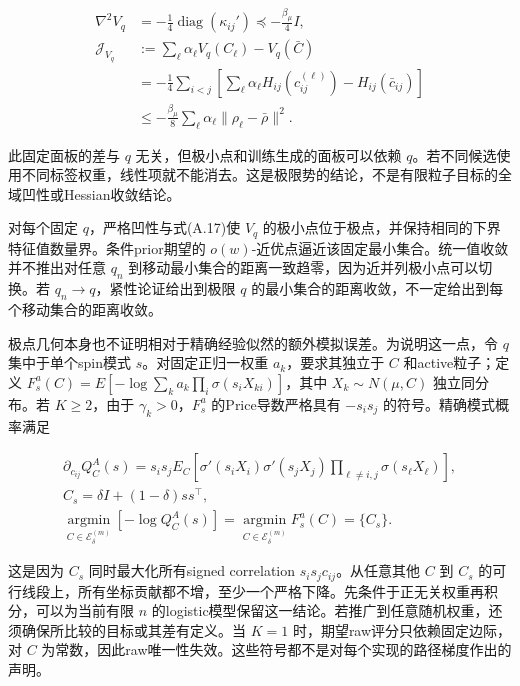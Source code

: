 \documentclass[11pt,a4paper]{article}
\begin{document}
\[
\begin{aligned}
\nabla^2V_q&=-\tfrac14\operatorname{diag}(\kappa_{ij}')
\preceq-\tfrac{\beta_\mu}{4}I,\\
\mathcal J_{V_q}
&:=\sum_\ell\alpha_\ell V_q(C_\ell)-V_q(\bar C)\\
&=-\tfrac14\sum_{i<j}\left[
\sum_\ell\alpha_\ell H_{ij}(c_{ij}^{(\ell)})-H_{ij}(\bar c_{ij})\right]\\
&\le-\tfrac{\beta_\mu}{8}\sum_\ell\alpha_\ell
\|\rho_\ell-\bar\rho\|^2.
\end{aligned}
\tag{A.34}
\]

此固定面板的差与 \(q\) 无关，但极小点和训练生成的面板可以依赖
\(q\)。若不同候选使用不同标签权重，线性项就不能消去。这是极限势的结论，不是有限粒子目标的全域凹性或Hessian收敛结论。

对每个固定 \(q\)，严格凹性与式(A.17)使 \(V_q\)
的极小点位于极点，并保持相同的下界特征值数量界。条件prior期望的
\(o(w)\)-近优点逼近该固定最小集合。统一值收敛并不推出对任意 \(q_n\)
到移动最小集合的距离一致趋零，因为近并列极小点可以切换。若
\(q_n\to q\)，紧性论证给出到极限 \(q\)
的最小集合的距离收敛，不一定给出到每个移动集合的距离收敛。

极点几何本身也不证明相对于精确经验似然的额外模拟误差。为说明这一点，令
\(q\) 集中于单个spin模式 \(s\)。对固定正归一权重 \(a_k\)，要求其独立于
\(C\) 和active粒子；定义
\(F_s^a(C)=E[-\log\sum_k a_k\prod_i\sigma(s_iX_{ki})]\)，其中
\(X_k\sim N(\mu,C)\) 独立同分布。若 \(K\ge2\)，由于
\(\gamma_k>0\)，\(F_s^a\) 的Price导数严格具有 \(-s_is_j\)
的符号。精确模式概率满足

\[
\begin{gathered}
\partial_{c_{ij}}Q_C^A(s)=s_is_jE_C\left[
\sigma'(s_iX_i)\sigma'(s_jX_j)
\prod_{\ell\ne i,j}\sigma(s_\ell X_\ell)\right],\\
C_s=\delta I+(1-\delta)ss^\top,\\
\operatorname*{argmin}_{C\in\mathcal E_\delta^{(m)}}[-\log Q_C^A(s)]
=\operatorname*{argmin}_{C\in\mathcal E_\delta^{(m)}}F_s^a(C)=\{C_s\}.
\end{gathered}
\tag{A.35}
\]

这是因为 \(C_s\) 同时最大化所有signed correlation
\(s_is_jc_{ij}\)。从任意其他 \(C\) 到 \(C_s\)
的可行线段上，所有坐标贡献都不增，至少一个严格下降。先条件于正无关权重再积分，可以为当前有限
\(n\)
的logistic模型保留这一结论。若推广到任意随机权重，还须确保所比较的目标或其差有定义。当
\(K=1\) 时，期望raw评分只依赖固定边际，对 \(C\)
为常数，因此raw唯一性失效。这些符号都不是对每个实现的路径梯度作出的声明。
\end{document}
